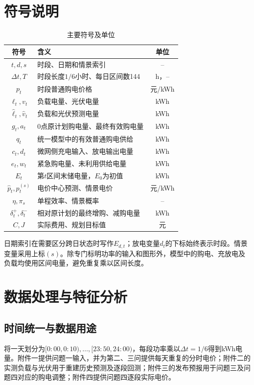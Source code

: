 \section{符号说明}
\begin{table}[htbp]\centering\small
\caption{主要符号及单位}\label{tab:symbols}
\begin{tabular}{clc}\toprule
符号 & 含义 & 单位\\\midrule
$t,d,s$ & 时段、日期和情景索引 & --\\
$\Delta t,T$ & 时段长度$1/6$小时、每日区间数144 & h，--\\
$p_t$ & 时段普通购电价格 & 元/kWh\\
$\ell_t,v_t$ & 负载电量、光伏电量 & kWh\\
$\widehat\ell_t,\widehat v_t$ & 负载和光伏预测电量 & kWh\\
$g_t,a_t$ & 0点原计划购电量、最终有效购电量 & kWh\\
$q_t$ & 统一模型中的有效普通购电供给 & kWh\\
$c_t,d_t$ & 微网侧充电输入、放电输出电量 & kWh\\
$e_t,w_t$ & 紧急购电量、未利用供给电量 & kWh\\
$E_t$ & 第$t$区间末储电量，$E_0$为初值 & kWh\\
$\widehat p_t,p_t^{(s)}$ & 电价中心预测、情景电价 & 元/kWh\\
$\eta,\pi_s$ & 单程效率、情景概率 & --\\
$\delta_t^+,\delta_t^-$ & 相对原计划的最终增购、减购电量 & kWh\\
$C,J$ & 实际费用、规划目标值 & 元\\
\bottomrule\end{tabular}
\end{table}
日期索引在需要区分跨日状态时写作$E_{d,t}$；放电变量$d_t$的下标始终表示时段。情景变量采用上标$(s)$。除专门标明功率的输入和图形外，模型中的购电、充放电及负载均使用区间电量，避免重复乘以区间长度。

\section{数据处理与特征分析}
\subsection{时间统一与数据用途}
将一天划分为$[0{:}00,0{:}10),\ldots,[23{:}50,24{:}00)$，每段功率乘以$\Delta t=1/6$得到kWh电量。附件一提供问题一输入，并为第二、三问提供每天重复的分时电价；附件二的实测负载与光伏用于重建历史预测及逐段回测；附件三的发布预报用于问题三及问题四对应的购电调整；附件四提供问题四逐段实际电价。

